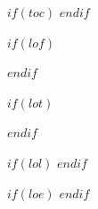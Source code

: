 
$if(toc)$
\tableofcontents
\clearpage
$endif$

$if(lof)$
\listoffigures
\clearpage
$endif$

$if(lot)$
\listoftables
\clearpage
$endif$

$if(lol)$
\lstlistoflistings
\clearpage
$endif$

$if(loe)$
\listofmyequations
\clearpage
$endif$
